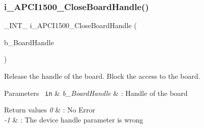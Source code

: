 \subsubsection{\texorpdfstring{i\_APCI1500\_CloseBoardHandle()}{i\_APCI1500\_CloseBoardHandle()}}
{\footnotesize\ttfamily \+\_\+\+I\+N\+T\+\_\+ i\+\_\+\+A\+P\+C\+I1500\+\_\+\+Close\+Board\+Handle (\begin{DoxyParamCaption}\item[{B\+Y\+T\+E\+\_\+}]{b\+\_\+\+Board\+Handle }\end{DoxyParamCaption})}

Release the handle of the board. Block the access to the board.


\begin{DoxyParams}[1]{Parameters}
\mbox{\texttt{ in}}  & {\em b\+\_\+\+Board\+Handle} & \+: Handle of the board\\
\hline
\end{DoxyParams}

\begin{DoxyRetVals}{Return values}
{\em 0} & \+: No Error ~\newline
\\
\hline
{\em -\/1} & \+: The device handle parameter is wrong ~\newline
\\
\hline
\end{DoxyRetVals}
